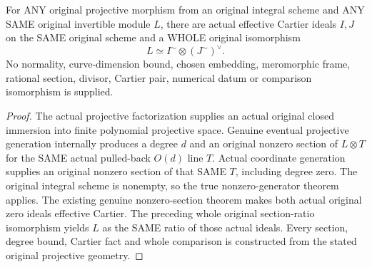 \begin{theorem}
\label{thm:fc-original-projective-line-cartier-ratio}
\leanok
{}
For ANY original projective morphism from an original integral scheme
and ANY SAME original invertible module $L$, there are actual effective
Cartier ideals $I,J$ on the SAME original scheme and a WHOLE original
isomorphism
\[
 L\simeq I^{\sim}\otimes(J^{\sim})^\vee.
\]
No normality, curve-dimension bound, chosen embedding, meromorphic frame,
rational section, divisor, Cartier pair, numerical datum or comparison
isomorphism is supplied.
\end{theorem}
\begin{proof}
The actual projective factorization supplies an actual original closed
immersion into finite polynomial projective space. Genuine eventual
projective generation internally produces a degree $d$ and an original
nonzero section of $L\otimes T$ for the SAME actual pulled-back $O(d)$
line $T$. Actual coordinate generation supplies an original nonzero
section of that SAME $T$, including degree zero. The original integral
scheme is nonempty, so the true nonzero-generator theorem applies.
The existing genuine nonzero-section theorem makes both actual original
zero ideals effective Cartier. The preceding whole original section-ratio
isomorphism yields $L$ as the SAME ratio of those actual ideals. Every
section, degree bound, Cartier fact and whole comparison is constructed
from the stated original projective geometry.
\end{proof}
